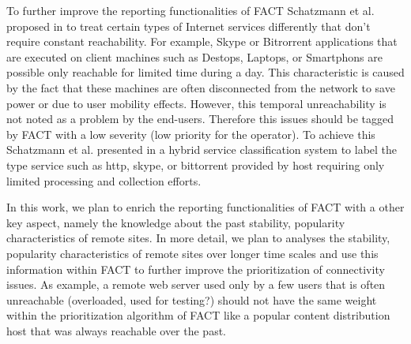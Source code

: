 \documentclass{sigcomm-alternate}
\begin{document}
To further improve the reporting functionalities of FACT Schatzmann et
al. proposed in \cite{MyPhDThesis} to treat certain types of Internet
services differently that don't require constant reachability.
For example, Skype or Bitrorrent applications that are executed on
client machines such as Destops, Laptops, or Smartphons are possible
only reachable for limited time during a day. This characteristic is
caused by the fact that these machines are often disconnected from the
network to save power or due to user mobility effects. However, this
temporal unreachability is not noted as a problem by the end-users.
Therefore this issues should be tagged by FACT with a low severity (low
priority for the operator). To achieve this Schatzmann et al. presented
in \cite{MyPhDThesis} a hybrid service classification system to label
the type service such as http, skype, or bittorrent provided by host
requiring only limited processing and collection efforts.

In this work, we plan to enrich the reporting functionalities of FACT
with a other key aspect, namely the knowledge about the past stability,
popularity characteristics of remote sites. In more detail, we plan to
analyses the stability, popularity characteristics of remote sites over
longer time scales and use this information within FACT to further
improve the prioritization of connectivity issues.  As example, a
remote web server used only by a few users that is often unreachable
(overloaded, used for testing?) should not have the same weight within
the prioritization algorithm of FACT like a popular content distribution
host that was always reachable over the past.

\end{document}
